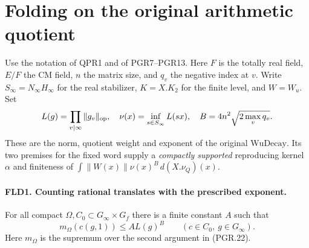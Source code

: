 \section{Folding on the original arithmetic quotient}
\label{sec:folding-v059}
Use the notation of QPR1 and of PGR7--PGR13. Here $F$ is the totally
real field, $E/F$ the CM field, $n$ the matrix size, and $q_v$ the
negative index at $v$. Write $S_\infty=N_\infty H_\infty$ for the
real stabilizer, $K=X.K_2$ for the finite level, and $W=W_u$.
Set
\[
  L(g)=\prod_{v\mid\infty}\|g_v\|_{\rm op},\quad
  \nu(x)=\inf_{s\in S_\infty}L(sx),\quad
  B=4n^2\sqrt{2\max_v q_v}.
\]
These are the norm, quotient weight and exponent of the original
$\mathrm{WuDecay}$. Its two premises for the fixed word supply a
\emph{compactly supported} reproducing kernel $\alpha$ and finiteness
of $\int \|W(x)\|\nu(x)^B\,d(X.\nu_Q)(x)$.

\paragraph{FLD1. Counting rational translates with the prescribed exponent.}
\label{claim:FLD1}
For all compact $\Omega,C_0\subset G_\infty\times G_f$ there is a
finite constant $A$ such that
\[
 m_\Omega(c(g,1))\le A L(g)^B\qquad(c\in C_0,\ g\in G_\infty).
\]
Here $m_\Omega$ is the supremum over the second argument in (PGR.22).

